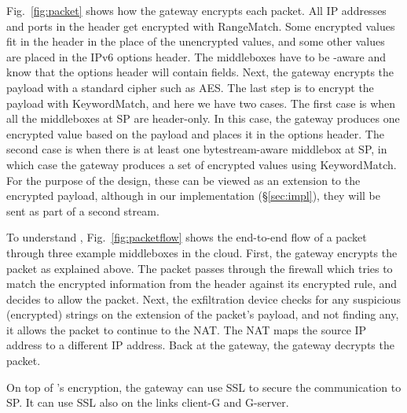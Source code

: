 Fig.~\ref{fig:packet} shows how the gateway encrypts each packet.
All IP addresses and ports in the header get encrypted with RangeMatch. Some encrypted values fit in the header in the place of the unencrypted values, and 
some other values are placed in the IPv6 options header. The middleboxes have to be \sys-aware and know that the options header will contain \sys fields.  
Next, the gateway encrypts the payload  with a standard cipher such as AES. 
The last step is to encrypt the payload with KeywordMatch, and here we have two cases. 
The first case is when all the middleboxes at SP are header-only. In this case, the gateway produces one encrypted value based on the payload and places it in the options header. The second case is when there is at least one bytestream-aware middlebox at SP, in which case the gateway produces a set of encrypted values using KeywordMatch. For the purpose of the design, these can be viewed as an extension to the encrypted payload, although in our implementation (\S\ref{sec:impl}), they will be sent as part of a second stream.

To understand \sys, Fig.~\ref{fig:packetflow} shows the end-to-end flow of a packet through three example middleboxes in the cloud.  First,  the gateway encrypts the packet as explained above. The packet passes through the firewall which tries to match the encrypted information from the header against its encrypted rule, and decides to allow the packet. Next, the exfiltration device checks for any suspicious (encrypted) strings on the extension of the packet's payload, and not finding any, it allows the packet  to continue to the NAT. The NAT maps the source IP address to a different IP address. Back at the gateway, the gateway decrypts the packet. 

On top of \sys's encryption, the gateway can use SSL  to secure the communication to SP.  It can use SSL also on the links client-G and G-server.


